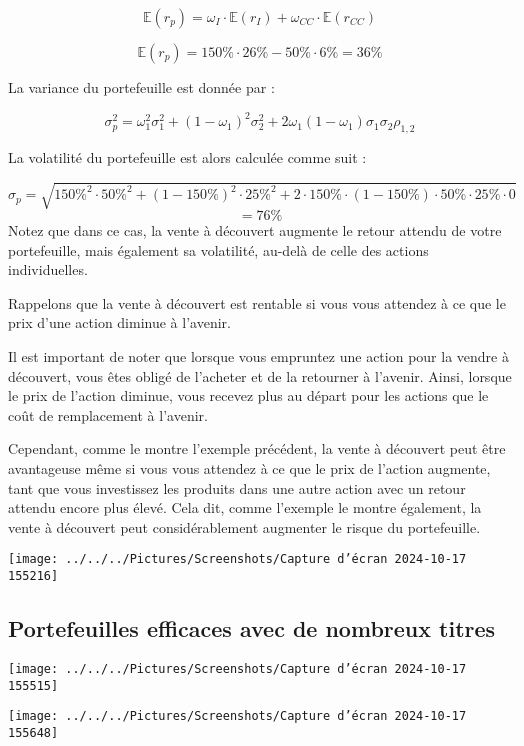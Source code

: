 \documentclass[a4paper, 12pt]{report}
\begin{document}
\[
\mathbb{E}(r_p) = \omega_I \cdot \mathbb{E}(r_I) + \omega_{CC} \cdot \mathbb{E}(r_{CC})
\]

\[
\mathbb{E}(r_p) = 150\% \cdot 26\% - 50\% \cdot 6\% = 36\%
\]

La variance du portefeuille est donnée par :

\[
\sigma^2_p = \omega^2_1 \sigma^2_1 + (1 - \omega_1)^2 \sigma^2_2 + 2 \omega_1 (1 - \omega_1) \sigma_1 \sigma_2 \rho_{1,2}
\]

La volatilité du portefeuille est alors calculée comme suit :

\[
\sigma_p = \sqrt{150\%^2 \cdot 50\%^2 + (1 - 150\%)^2 \cdot 25\%^2 + 2 \cdot 150\% \cdot (1 - 150\%) \cdot 50\% \cdot 25\% \cdot 0}
\]
\[ 
= 76\%
 \]
Notez que dans ce cas, la vente à découvert augmente le retour attendu de votre portefeuille, mais également sa volatilité, au-delà de celle des actions individuelles.

Rappelons que la vente à découvert est rentable si vous vous attendez à ce que le prix d'une action diminue à l'avenir. 

Il est important de noter que lorsque vous empruntez une action pour la vendre à découvert, vous êtes obligé de l'acheter et de la retourner à l'avenir. Ainsi, lorsque le prix de l'action diminue, vous recevez plus au départ pour les actions que le coût de remplacement à l'avenir.

Cependant, comme le montre l'exemple précédent, la vente à découvert peut être avantageuse même si vous vous attendez à ce que le prix de l'action augmente, tant que vous investissez les produits dans une autre action avec un retour attendu encore plus élevé. Cela dit, comme l'exemple le montre également, la vente à découvert peut considérablement augmenter le risque du portefeuille.



\begin{center}
	
	\texttt{[image: ../../../Pictures/Screenshots/Capture d'écran 2024-10-17 155216]}

\end{center}
\subsection{Portefeuilles efficaces avec de nombreux titres}
\begin{center}
	
	\texttt{[image: ../../../Pictures/Screenshots/Capture d'écran 2024-10-17 155515]}

\end{center}
\begin{center}
	
\texttt{[image: ../../../Pictures/Screenshots/Capture d'écran 2024-10-17 155648]}


\end{center}
\end{document}
